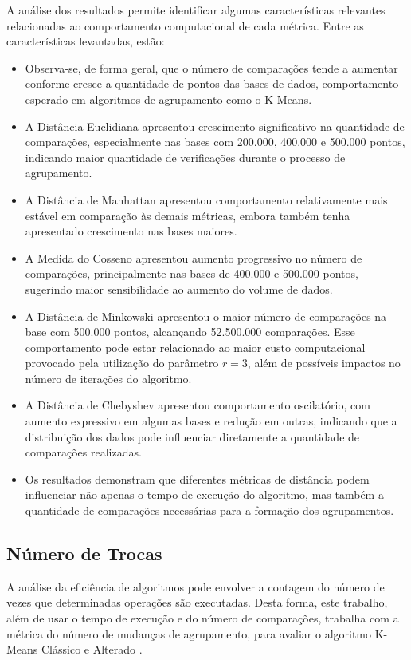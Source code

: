 \documentclass[10pt,a4paper,twocolumn]{article}
\begin{document}


A análise dos resultados permite identificar algumas características relevantes relacionadas ao comportamento computacional de cada métrica. Entre as características levantadas, estão: 
\begin{itemize}
\item Observa-se, de forma geral, que o número de comparações tende a aumentar conforme cresce a quantidade de pontos das bases de dados, comportamento esperado em algoritmos de agrupamento como o K-Means.
\item A Distância Euclidiana apresentou crescimento significativo na quantidade de comparações, especialmente nas bases com 200.000, 400.000 e 500.000 pontos, indicando maior quantidade de verificações durante o processo de agrupamento.
\item A Distância de Manhattan apresentou comportamento relativamente mais estável em comparação às demais métricas, embora também tenha apresentado crescimento nas bases maiores.
\item A Medida do Cosseno apresentou aumento progressivo no número de comparações, principalmente nas bases de 400.000 e 500.000 pontos, sugerindo maior sensibilidade ao aumento do volume de dados.
\item A Distância de Minkowski apresentou o maior número de comparações na base com 500.000 pontos, alcançando 52.500.000 comparações. Esse comportamento pode estar relacionado ao maior custo computacional provocado pela utilização do parâmetro $r = 3$, além de possíveis impactos no número de iterações do algoritmo.
\item A Distância de Chebyshev apresentou comportamento oscilatório, com aumento expressivo em algumas bases e redução em outras, indicando que a distribuição dos dados pode influenciar diretamente a quantidade de comparações realizadas.
\item Os resultados demonstram que diferentes métricas de distância podem influenciar não apenas o tempo de execução do algoritmo, mas também a quantidade de comparações necessárias para a formação dos agrupamentos.
\end{itemize}


\subsection{Número de Trocas}
\label{subsec:nTrocas}
A análise da eficiência de algoritmos pode envolver a contagem do número de vezes que determinadas operações são executadas. Desta forma, este trabalho, além de usar o tempo de execução e do número de comparações, trabalha com a métrica do número de mudanças de agrupamento, para avaliar o algoritmo K-Means Clássico e Alterado \cite{Knuth1998}. 
\end{document}
